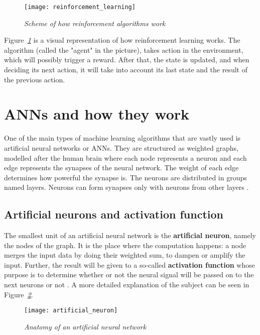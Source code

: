 \begin{figure}[h]
    \centering
    \texttt{[image: reinforcement\_learning]}
    \caption{\emph{Scheme of how reinforcement algorithms work \cite{typesMLMedium}}}
    \label{fig:reinforcement_learning}
\end{figure}

Figure\emph{~\ref{fig:reinforcement_learning}} is a visual representation of how reinforcement learning works. The algorithm
(called the "agent" in the picture), takes action in the environment,
which will possibly trigger a reward. After that, the state is updated,
and when deciding its next action, it will take into account its last state and the
result of the previous action.

\section{ANNs and how they work}
One of the main types of machine learning algorithms that are vastly used is
artificial neural networks or ANNs.
They are structured as weighted graphs, modelled after the
human brain where each node represents a neuron and each
edge represents the synapses of the neural network.
The weight of each edge determines how powerful the synapse is.
The neurons are distributed in groups named layers.
Neurons can form synapses only with neurons from other layers \cite{understandingANN}.

\subsection{Artificial neurons and activation function}

The smallest unit of an artificial neural network is the \textbf{artificial neuron},
namely the nodes of the graph. It is the place where the computation happens:
a node merges the input data by doing their weighted sum, to dampen or amplify the input.
Further, the result will be given to a so-called \textbf{activation function} whose purpose is to
determine whether or not the neural signal will be passed on to the next neurons or not \cite{pathMind}.
A more detailed explanation of the subject can be seen in Figure\emph{~\ref{fig:artificial_neuron}}.

\begin{figure}[h]
    \centering
    \texttt{[image: artificial\_neuron]}
    \caption{\emph{Anatomy of an artificial neural network \cite{pathMind}}}
    \label{fig:artificial_neuron}
\end{figure}

